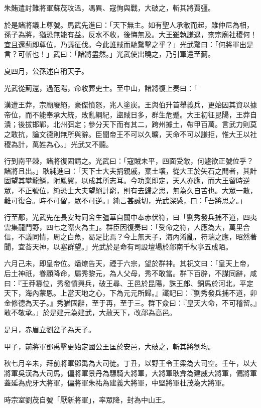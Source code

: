\begin{pinyinscope}
朱鮪遣討難將軍蘇茂攻溫，馮異、寇恂與戰，大破之，斬其將賈彊。

於是諸將議上尊號。馬武先進曰：「天下無主。如有聖人承敝而起，雖仲尼為相，孫子為將，猶恐無能有益。反水不收，後悔無及。大王雖執謙退，柰宗廟社稷何！宜且還薊即尊位，乃議征伐。今此誰賊而馳騖擊之乎？」光武驚曰：「何將軍出是言？可斬也！」武曰：「諸將盡然。」光武使出曉之，乃引軍還至薊。

夏四月，公孫述自稱天子。

光武從薊還，過范陽，命收葬吏士。至中山，諸將復上奏曰：「

漢遭王莽，宗廟廢絕，豪傑憤怒，兆人塗炭。王與伯升首舉義兵，更始因其資以據帝位，而不能奉承大統，敗亂綱紀，盜賊日多，群生危蹙。大王初征昆陽，王莽自潰；後拔邯鄲，北州弭定；參分天下而有其二，跨州據土，帶甲百萬。言武力則莫之敢抗，論文德則無所與辭。臣聞帝王不可以久曠，天命不可以謙拒，惟大王以社稷為計，萬姓為心。」光武又不聽。

行到南平棘，諸將復固請之。光武曰：「寇賊未平，四面受敵，何遽欲正號位乎？諸將且出。」耿純進曰：「天下士大夫捐親戚，棄土壤，從大王於矢石之閒者，其計固望其攀龍鱗，附鳳翼，以成其所志耳。今功業即定，天人亦應，而大王留時逆眾，不正號位，純恐士大夫望絕計窮，則有去歸之思，無為久自苦也。大眾一散，難可復合。時不可留，眾不可逆。」純言甚誠切，光武深感，曰：「吾將思之。」

行至鄗，光武先在長安時同舍生彊華自關中奉赤伏符，曰「劉秀發兵捕不道，四夷雲集龍鬥野，四七之際火為主」。群臣因復奏曰：「受命之符，人應為大，萬里合信，不議同情，周之白魚，曷足比焉？今上無天子，海內淆亂，符瑞之應，昭然著聞，宜荅天神，以塞群望。」光武於是命有司設壇場於鄗南千秋亭五成陌。

六月己未，即皇帝位。燔燎告天，禋于六宗，望於群神。其祝文曰：「皇天上帝，后土神祇，眷顧降命，屬秀黎元，為人父母，秀不敢當。群下百辟，不謀同辭，咸曰：『王莽篡位，秀發憤興兵，破王尋、王邑於昆陽，誅王郎、銅馬於河北，平定天下，海內蒙恩。上當天地之心，下為元元所歸。』讖記曰：『劉秀發兵捕不道，卯金修德為天子。』秀猶固辭，至于再，至于三。群下僉曰：『皇天大命，不可稽留。』敢不敬承。」於是建元為建武，大赦天下，改鄗為高邑。

是月，赤眉立劉盆子為天子。

甲子，前將軍鄧禹擊更始定國公王匡於安邑，大破之，斬其將劉均。

秋七月辛未，拜前將軍鄧禹為大司徒。丁丑，以野王令王梁為大司空。壬午，以大將軍吳漢為大司馬，偏將軍景丹為驃騎大將軍，大將軍耿弇為建威大將軍，偏將軍蓋延為虎牙大將軍，偏將軍朱祐為建義大將軍，中堅將軍杜茂為大將軍。

時宗室劉茂自號「厭新將軍」，率眾降，封為中山王。


\end{pinyinscope}
